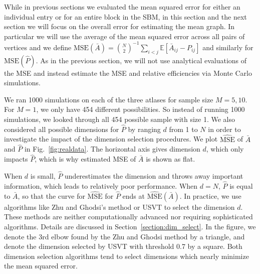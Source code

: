 \documentclass[10pt,letterpaper]{article}
\newcommand{\Ex}{\mathbb{E}}
\renewcommand{\hat}{\widehat}
\begin{document}
While in previous sections we evaluated the mean squared error for either an individual entry or for an entire block in the SBM, in this section and the next section we will focus on the overall error for estimating the mean graph.
In particular we will use the average of the mean squared error across all pairs of vertices and we define $\mathrm{MSE}(\bar{A}) = \binom{N}{2}^{-1} \sum_{i<j}\Ex[\bar{A}_{ij}-P_{ij}]$ and similarly for $\mathrm{MSE}(\hat{P})$.
As in the previous section, we will not use analytical evaluations of the MSE and instead estimate the MSE and relative efficiencies via Monte Carlo simulations.

We ran 1000 simulations on each of the three atlases for sample size $M=5, 10$. For $M=1$, we only have 454 different possibilities. So instead of running 1000 simulations, we looked through all 454 possible sample with size 1.
We also considered all possible dimensions for $\hat{P}$ by ranging $d$ from 1 to $N$ in order to investigate the impact of the dimension selection procedures.
We plot $\hat{\mathrm{MSE}}$ of $\bar{A}$ and $\hat{P}$ in Fig.~\ref{fig:realdata}.
The horizontal axis gives dimension $d$, which only impacts $\hat{P}$, which is why estimated MSE of $\bar{A}$ is shown as flat.

When $d$ is small, $\hat{P}$ underestimates the dimension and throws away important information, which leads to relatively poor performance. When $d=N$, $\hat{P}$ is equal to $\bar{A}$, so that the curve for $\hat{\mathrm{MSE}}$ for $\hat{P}$ ends at $\hat{\mathrm{MSE}}(\bar{A})$. 
In practice, we use algorithms like Zhu and Ghodsi's method or USVT to select the dimension $d$. These methods are neither computationally advanced nor requiring sophisticated algorithms. Details are discussed in Section~\ref{section:dim_select}. 
In the figure, we denote the 3rd elbow found by the Zhu and Ghodsi method by a triangle, and denote the dimension selected by USVT with threshold 0.7 by a square. 
Both dimension selection algorithms tend to select dimensions which nearly minimize the mean squared error.
\end{document}
